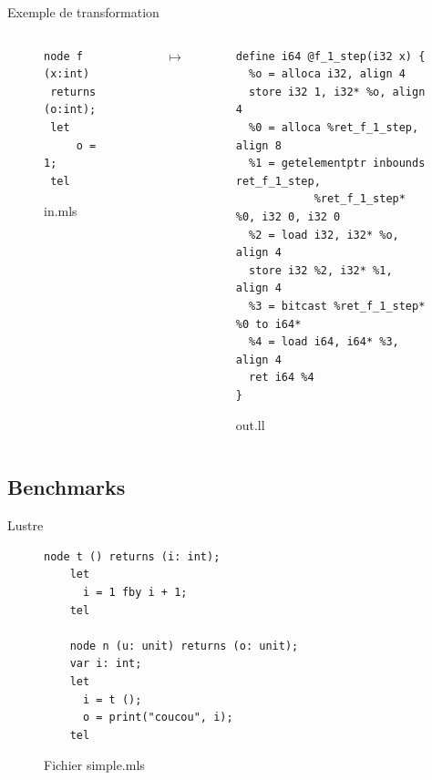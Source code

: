 \documentclass{beamer} %
\begin{document}
\begin{frame}[fragile]{Exemple de transformation}
    \begin{columns}
    \begin{column}{0.30\textwidth}
        \begin{figure}
        \begin{lstlisting}[language=lustre]
 node f (x:int)
 returns (o:int);
 let
     o = 1;
 tel \end{lstlisting}
            \caption{in.mls}
        \end{figure}

    \end{column}
    \begin{column}{0.05\textwidth}
        $\mapsto$
    \end{column}
    \begin{column}{0.65\textwidth}  %
        \begin{figure}
    \begin{verbatim}
define i64 @f_1_step(i32 x) {
  %o = alloca i32, align 4
  store i32 1, i32* %o, align 4
  %0 = alloca %ret_f_1_step, align 8
  %1 = getelementptr inbounds ret_f_1_step,
            %ret_f_1_step* %0, i32 0, i32 0
  %2 = load i32, i32* %o, align 4
  store i32 %2, i32* %1, align 4
  %3 = bitcast %ret_f_1_step* %0 to i64*
  %4 = load i64, i64* %3, align 4
  ret i64 %4
}
   \end{verbatim}
            \vspace{-1cm}
            \caption{out.ll}
        \end{figure}
    \end{column}
    \end{columns}
\end{frame}

\subsection{Benchmarks}

\begin{frame}[fragile]{Lustre}
    \begin{figure}
        \begin{lstlisting}[language=lustre]
    node t () returns (i: int);
    let
      i = 1 fby i + 1;
    tel

    node n (u: unit) returns (o: unit);
    var i: int;
    let
      i = t ();
      o = print("coucou", i);
    tel
        \end{lstlisting}
        \caption{Fichier simple.mls}
    \end{figure}

\end{frame}
\end{document}
